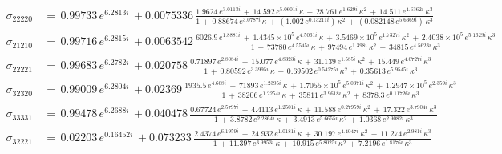 \begin{align}
  \label{eq:ys22220}
  \sigma_{22220} \, &= \, 0.99733\,e^{6.2813i} \, + 0.0075336 \, \frac{ 1.9624\,e^{3.0113i} \, + \, 14.592\,e^{5.0601i}\,\kappa \, + \, 28.761\,e^{1.629i}\,{\kappa}^{2} \, + \, 14.511\,e^{4.6362i}\,{\kappa}^{3} }{ 1 \, + \,   0.88674\,e^{3.0787i}\,\kappa \, + \, (1.002\,e^{0.13211i})\,{\kappa}^{2} \, + \, (0.082148\,e^{5.6369i})\,{\kappa}^{3} }   \\
  \label{eq:ys21210}
  \sigma_{21210} \, &= \, 0.99716\,e^{6.2815i} \, + 0.0063542 \, \frac{ 6026.9\,e^{1.8881i}  \, + \, 1.4345\times 10^5\,e^{4.5061i}\,\kappa \, + \, 3.5469\times 10^5\,e^{1.7327i}\,{\kappa}^{2} \, + \, 2.4038\times 10^5\,e^{5.1629i}\,{\kappa}^{3} }{ 1 \, + \,   73780\,e^{4.5545i}\,\kappa \, + \, 97494\,e^{1.398i}\,{\kappa}^{2} \, + \, 34815\,e^{4.5623i}\,{\kappa}^{3} }   \\
  \label{eq:ys22221}
  \sigma_{22221} \, &= \, 0.99683\,e^{6.2782i} \, + 0.020758 \, \frac{  0.71897\,e^{2.8084i}  \, + \,  15.077\,e^{4.8323i}\,\kappa \, + \, 31.139\,e^{1.585i}\,{\kappa}^{2} \, + \, 15.449\,e^{4.6727i}\,{\kappa}^{3} }{ 1 \, + \,   0.80592\,e^{3.3995i}\,\kappa \, + \, 0.69502\,e^{0.54275i}\,{\kappa}^{2} \, + \, 0.35613\,e^{5.9545i}\,{\kappa}^{3} }   \\
  \label{eq:ys32320}
  \sigma_{32320} \, &= \, 0.99009\,e^{6.2804i} \, + 0.02369 \, \frac{  1935.5\,e^{4.668i} \, + \,  71893\,e^{1.2395i}\,\kappa \, + \, 1.7055\times 10^5\,e^{5.0371i}\,{\kappa}^{2} \, + \, 1.2947\times 10^5\,e^{2.359i}\,{\kappa}^{3} }{ 1 \, + \,   38206\,e^{1.2254i}\,\kappa \, + \, 35811\,e^{3.9618i}\,{\kappa}^{2} \, + \, 8378.3\,e^{0.11726i}\,{\kappa}^{3} }   \\
  \label{eq:ys33331}
  \sigma_{33331} \, &= \, 0.99478\,e^{6.2688i} \, + 0.040478 \, \frac{ 0.67724\,e^{2.5797i}  \, + \,   4.4113\,e^{1.2501i}\,\kappa \, + \, 11.588\,e^{0.27959i}\,{\kappa}^{2} \, + \, 17.322\,e^{3.7904i}\,{\kappa}^{3} }{ 1 \, + \,   3.8782\,e^{2.2864i}\,\kappa \, + \, 3.4913\,e^{5.6655i}\,{\kappa}^{2} \, + \, 1.0368\,e^{2.9082i}\,{\kappa}^{3} }   \\
  \label{eq:ys32221}
  \sigma_{32221} \, &= \, 0.02203\,e^{0.16452i} \, + 0.073233 \, \frac{ 2.4374\,e^{6.1959i}  \, + \,   24.932\,e^{1.0181i}\,\kappa \, + \, 30.197\,e^{4.4047i}\,{\kappa}^{2} \, + \, 11.274\,e^{2.981i}\,{\kappa}^{3} }{ 1 \, + \,   11.397\,e^{3.9953i}\,\kappa \, + \, 10.915\,e^{5.8025i}\,{\kappa}^{2} \, + \, 7.2196\,e^{1.8176i}\,{\kappa}^{3} }   \\

\end{align}
